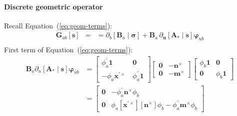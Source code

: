 \paragraph{Discrete geometric operator}
Recall Equation~(\ref{eq:geom-terms}):
\begin{equation*} 
\begin{aligned}
\bm{G}_{ab}[\bm{s}] &= 
&= \partial_b[\bm{B}_a\mid\bm{\sigma}] + \bm{B}_a \, \partial_{\bm{u}} [\bm{A}_*\mid\bm{s}] \bm{\varphi}_{u b} \\
\end{aligned}
\end{equation*}
%
First term of Equation~(\ref{eq:geom-terms}): %
\begin{equation*} 
     \begin{aligned}
     \bm{B}_a\partial_u [\bm{A}_*\mid\bm{s}]\bm{\varphi}_{u b}
     &= \begin{bmatrix}
      \phi_a^\prime\mathbf{1} & \mathbf{0} \\
      -\phi_a \bm{x}^{\prime\times} \, & \phi_a^{\prime} \mathbf{1}
      \end{bmatrix} \begin{bmatrix}
       \mathbf{0} & -\bm{n}^{\times} \\
       \mathbf{0} & -\bm{m}^{\times}
      \end{bmatrix} \begin{bmatrix}
          \phi_b \mathbf{1} & \mathbf{0} \\
          \mathbf{0} & \phi_b \mathbf{1}
      \end{bmatrix}\\
     &= \begin{bmatrix}
       \mathbf{0} & -\phi_a^\prime \bm{n}^{\times} \phi_b \\
       \mathbf{0} & \phi_a[\bm{x}^{\prime\times}][\bm{n}^\times]\phi_b 
       -\phi_a^\prime  \bm{m}^{\times} \phi_b
      \end{bmatrix} \\
     \end{aligned}
     \end{equation*}
 
